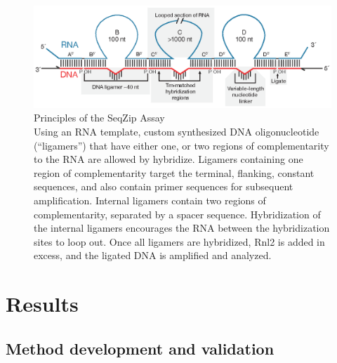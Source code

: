 {	\begin{figure}[htbp] %
		\centering 
		\includegraphics{Figures/SeqZipPaper/Roy2014Fig1.eps}
		\caption[Principles of the SeqZip Assay]
		{
			Principles of the SeqZip Assay\\[0.25cm]
			Using an RNA template, custom synthesized DNA oligonucleotide (``ligamers'') that have either one, or two regions of complementarity to the RNA are allowed by hybridize. Ligamers containing one region of complementarity target the terminal, flanking, constant sequences, and also contain primer sequences for subsequent amplification. Internal ligamers contain two regions of complementarity, separated by a spacer sequence. Hybridization of the internal ligamers encourages the RNA between the hybridization sites to loop out. Once all ligamers are hybridized, Rnl2 is added in excess, and the ligated DNA is amplified and analyzed.
			}
		\label{fig:Roy2014 F1}
		\end{figure}

\section{Results}\label{c2sec: Results}

	\subsection{Method development and validation}

}

